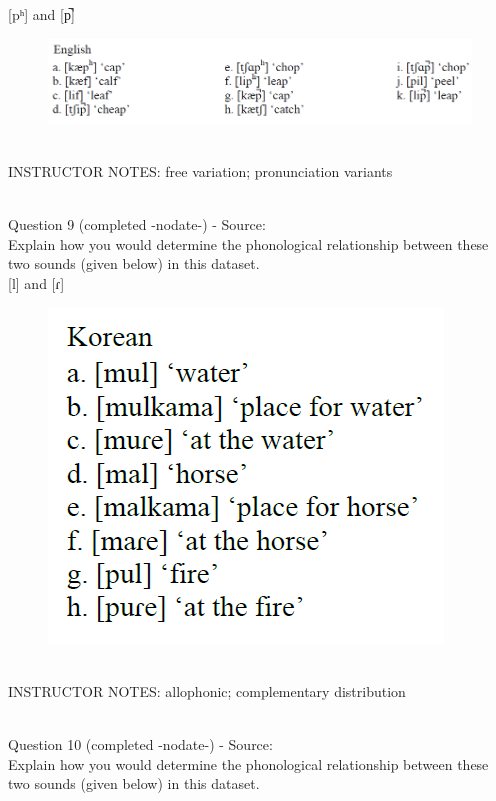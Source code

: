\documentclass[12pt]{article}
\begin{document}
{[pʰ]} and {[p̚]}

\begin{figure}[H]
\includegraphics{../images/english_labials.png}
\end{figure}

~\\
INSTRUCTOR NOTES: free variation; pronunciation variants


~\\

{\large Question 9} (completed -nodate-) - Source: \\

Explain how you would determine the phonological relationship between these two sounds (given below) in this dataset.\\

{[l]} and {[ɾ]}

\begin{figure}[H]
\includegraphics{../images/korean.png}
\end{figure}

~\\
INSTRUCTOR NOTES: allophonic; complementary distribution


~\\

{\large Question 10} (completed -nodate-) - Source: \\

Explain how you would determine the phonological relationship between these two sounds (given below) in this dataset.\\
\end{document}
